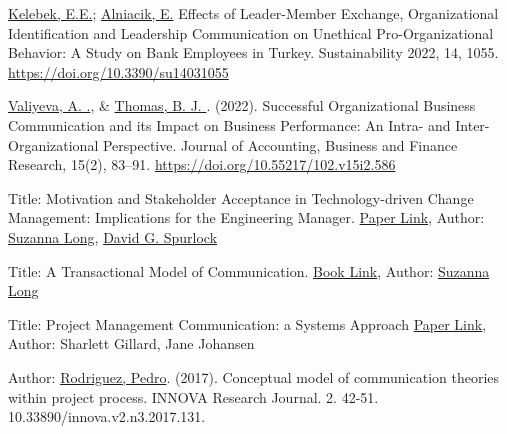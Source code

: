 \documentclass[runningheads]{llncs}
\begin{document}
%
%
%
% 
% 
%
\begin{thebibliography}{8}
\href{https://scholar.google.com/scholar?q=Ezgi%20Erbas%20Kelebek}{Kelebek, E.E.}; \href{https://scholar.google.com/citations?user=usQNm7AAAAAJ&hl=en&oi=ao}{Alniacik, E.} Effects of Leader-Member Exchange, Organizational Identification and Leadership Communication on Unethical Pro-Organizational Behavior: A Study on Bank Employees in Turkey. Sustainability 2022, 14, 1055. \url{https://doi.org/10.3390/su14031055}

\href{https://scholar.google.com/citations?user=TUmIhUwAAAAJ&hl=en}{Valiyeva, A. .}, & \href{https://scholar.google.com/citations?user=YsJ_qDwAAAAJ&hl=en}{Thomas, B. J. }. (2022). Successful Organizational Business Communication and its Impact on Business Performance: An Intra- and Inter-Organizational Perspective. Journal of Accounting, Business and Finance Research, 15(2), 83–91. \url{https://doi.org/10.55217/102.v15i2.586}

Title: Motivation and Stakeholder Acceptance in Technology-driven Change Management: Implications for the Engineering Manager. \href{https://www.tandfonline.com/doi/abs/10.1080/10429247.2008.11431764}{Paper Link}, Author: \href{https://scholar.google.com/citations?user=7_LPDDQAAAAJ&hl=en}{Suzanna Long}, \href{https://emse.mst.edu/facultystafffacilities/emsefaculty/davidspurlock/}{David G. Spurlock}

Title: A Transactional Model of Communication. \href{https://www.taylorfrancis.com/chapters/edit/10.4324/9781315080918-5/transactional-model-communication-dean-barnlund}{Book Link}, Author: \href{https://scholar.google.com/citations?user=7_LPDDQAAAAJ&hl=en}{Suzanna Long}

Title: Project Management Communication: a Systems Approach \href{https://www.researchgate.net/publication/220195825_Project_Management_Communication_a_Systems_Approach}{Paper Link}, Author: Sharlett Gillard, Jane Johansen

Author: \href{https://scholar.google.com/citations?user=o355sjwAAAAJ&hl=en}{Rodriguez, Pedro}. (2017). Conceptual model of communication theories within project process. INNOVA Research Journal. 2. 42-51. 10.33890/innova.v2.n3.2017.131. 


\end{thebibliography}
\end{document}
